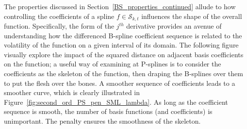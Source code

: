 \documentclass[12pt]{article}
\theoremstyle{definition}
\begin{document}
The properties discussed in Section~\ref{BS_properties_continued} allude to how controlling the coefficients of a spline $f \in \mathscr{S}_{k,t}$ influences the shape of the overall function. Specifically, the form of the $j^{th}$ derivative provides an avenue of understanding how the differenced B-spline coefficient sequence is related to the volatility of the function on a given interval of its domain. The following figure visually explore the impact of the squared distance on adjacent basis coefficients on the function; a useful way of examining at P-splines is to consider the coefficients as the skeleton of the function, then draping the B-splines over them to put the flesh over the bones. A smoother sequence of coefficients leads to a smoother curve, which is clearly illustrated in Figure~\ref{fig:second_ord_PS_pen_SML_lambda}. As long as the coefficient sequence is smooth, the number of basis functions (and coefficients) is unimportant. The penalty ensures the smoothness of the skeleton.
\end{document}
